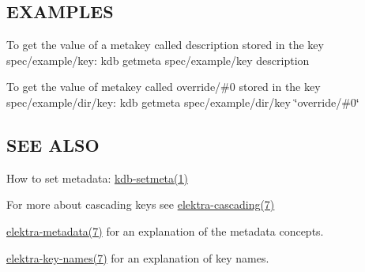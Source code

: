 \subsection*{E\+X\+A\+M\+P\+L\+ES}

To get the value of a metakey called {\ttfamily description} stored in the key {\ttfamily spec/example/key}\+: {\ttfamily kdb getmeta spec/example/key description}

To get the value of metakey called {\ttfamily override/\#0} stored in the key {\ttfamily spec/example/dir/key}\+: {\ttfamily kdb getmeta spec/example/dir/key \char`\"{}override/\#0\char`\"{}}

\subsection*{S\+EE A\+L\+SO}


\begin{DoxyItemize}
\item How to set metadata\+: \hyperlink{md_doc_help_kdb-setmeta_doc_help_kdb-setmeta_md}{kdb-\/setmeta(1)}
\item For more about cascading keys see \hyperlink{md_doc_help_elektra-cascading_doc_help_elektra-cascading_md}{elektra-\/cascading(7)}
\item \hyperlink{md_doc_help_elektra-metadata_doc_help_elektra-metadata_md}{elektra-\/metadata(7)} for an explanation of the metadata concepts.
\item \hyperlink{md_doc_help_elektra-key-names_doc_help_elektra-key-names_md}{elektra-\/key-\/names(7)} for an explanation of key names. 
\end{DoxyItemize}